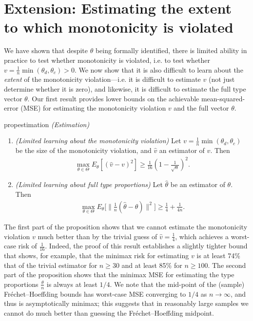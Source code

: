 \documentclass[12pt,reqno]{amsart}
\theoremstyle{theorem}
\theoremstyle{definition}
\newcommand{\0}{\mathbf{0}}
\newcommand{\1}{\mathbf{1}}
\begin{document}
\section{Extension: Estimating the extent to which monotonicity is violated}

We have shown that despite $\theta$ being formally identified, there is limited ability in practice to test whether monotonicity is violated, i.e. to test whether $v = \frac{1}{n} \min(\theta_d,\theta_c) > 0$. We now show that it is also difficult to learn about the \emph{extent} of the monotonicity violation---i.e. it is difficult to estimate $v$ (not just determine whether it is zero), and likewise, it is difficult to estimate the full type vector $\theta$. Our first result provides lower bounds on the achievable mean-squared-error (MSE) for estimating the monotonicity violation $v$ and the full vector $\theta$.



\begin{restatable}{prop}{estimation}
\label{prop:estimation}
\emph{(Estimation)}
\begin{enumerate}
    \item \emph{(Limited learning about the monotonicity violation)}
        Let $v = \tfrac{1}{n} \min(\theta_d,\theta_c)$ be the size of the monotonicity violation, and $\hat{v}$ an estimator of $v$. Then
        \begin{align*}
            \max_{\theta \in \Theta} E_\theta [ (\hat{v} - v )^2] \geq \frac{1}{16}  \left(1 - \frac{1}{\sqrt{n}}\right)^2.
        \end{align*}

    \item \emph{(Limited learning about full type proportions)}
        Let $\hat{\theta}$ be an estimator of $\theta$.
        Then
        \begin{align*}
            \max_{\theta \in \Theta} E_\theta\bigg[ \big\| \tfrac{1}{n} (\hat{\theta} - \theta) \big\|^2 \bigg] \geq  \frac{1}{4} + \frac{1}{4 n}.
        \end{align*}
    \end{enumerate}
\end{restatable}

The first part of the proposition shows that we cannot estimate the monotonicity violation $v$ much better than by the trivial guess of $\hat{v} = \tfrac{1}{4}$, which achieves a worst-case risk of $\tfrac{1}{16}$. Indeed, the proof of this result establishes a slightly tighter bound that shows, for example, that the minimax risk for estimating $v$ is at least 74\% that of the trivial estimator for $n \geq 30$ and at least 85\% for $n \geq 100$. The second part of the proposition shows that the minimax MSE for estimating the type proportions $\frac{\theta}{n}$ is always at least $1/4$. We note that the mid-point of the (sample) Fr\'echet--Hoeffding bounds has worst-case MSE converging to $1/4$ as $n \to \infty$, and thus is asymptotically minimax; this suggests that in reasonably large samples we cannot do much better than guessing the Fr\'echet--Hoeffding midpoint. 
\end{document}
